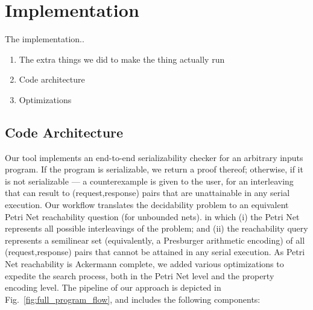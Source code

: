 

\section{Implementation}
\label{sec:implementation}


The implementation..

\begin{enumerate}
	\item The extra things we did to make the thing actually run
	\item Code architecture
	\item Optimizations
\end{enumerate}



\subsection{Code Architecture}

\label{subsec:codeArchitecture}

Our tool implements an end-to-end serializability checker for an arbitrary inputs program. If the program is serializable, we return a proof thereof; otherwise, if it is not serializable --- a counterexample is given to the user, for an interleaving that can result to (request,response) pairs that are unattainable in any serial execution.
%
Our workflow translates the decidability problem to an equivalent Petri Net reachability question (for unbounded nets). in which (i) the Petri Net represents all possible interleavings of the problem; and (ii) the reachability query represents a semilinear set (equivalently, a Presburger arithmetic encoding) of all (request,response) pairs that cannot be attained in any serial execution.
%
As Petri Net reachability is Ackermann complete, we added various optimizations to expedite the search process, both in the Petri Net level and the property encoding level.
%
The pipeline of our approach is depicted in Fig.~\ref{fig:full_program_flow}, and includes the following components:
 

